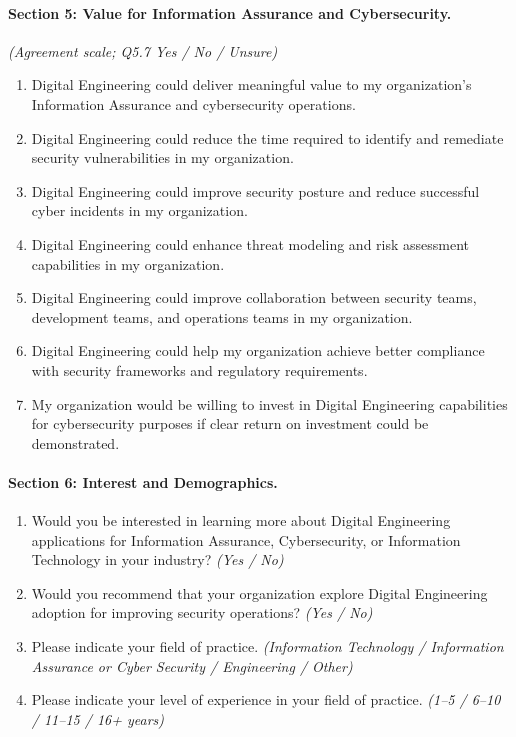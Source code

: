   \paragraph{Section 5: Value for Information Assurance and Cybersecurity.} \emph{(Agreement scale; Q5.7 Yes / No / Unsure)}
  \begin{enumerate}[leftmargin=2.4em,itemsep=1pt]
    \item[Q5.1] Digital Engineering could deliver meaningful value to my organization's Information Assurance and cybersecurity operations.
    \item[Q5.2] Digital Engineering could reduce the time required to identify and remediate security vulnerabilities in my organization.
    \item[Q5.3] Digital Engineering could improve security posture and reduce successful cyber incidents in my organization.
    \item[Q5.4] Digital Engineering could enhance threat modeling and risk assessment capabilities in my organization.
    \item[Q5.5] Digital Engineering could improve collaboration between security teams, development teams, and operations teams in my organization.
    \item[Q5.6] Digital Engineering could help my organization achieve better compliance with security frameworks and regulatory requirements.
    \item[Q5.7] My organization would be willing to invest in Digital Engineering capabilities for cybersecurity purposes if clear return on investment could be demonstrated.
  \end{enumerate}

  \paragraph{Section 6: Interest and Demographics.}
  \begin{enumerate}[leftmargin=2.4em,itemsep=1pt]
    \item[Q6.1] Would you be interested in learning more about Digital Engineering applications for Information Assurance, Cybersecurity, or Information Technology in your industry? \emph{(Yes / No)}
    \item[Q6.2] Would you recommend that your organization explore Digital Engineering adoption for improving security operations? \emph{(Yes / No)}
    \item[Q6.3] Please indicate your field of practice. \emph{(Information Technology / Information Assurance or Cyber Security / Engineering / Other)}
    \item[Q6.4] Please indicate your level of experience in your field of practice. \emph{(1--5 / 6--10 / 11--15 / 16+ years)}
  \end{enumerate}

